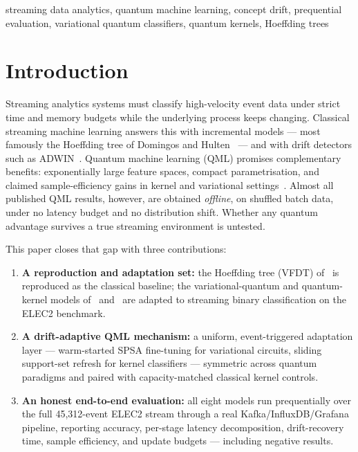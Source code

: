 \documentclass[conference]{IEEEtran}
\begin{document}
\begin{IEEEkeywords}
streaming data analytics, quantum machine learning, concept drift, prequential evaluation,
variational quantum classifiers, quantum kernels, Hoeffding trees
\end{IEEEkeywords}

\section{Introduction}
\label{sec:intro}

Streaming analytics systems must classify high-velocity event data under strict time and
memory budgets while the underlying process keeps changing. Classical streaming machine
learning answers this with incremental models --- most famously the Hoeffding tree of
Domingos and Hulten~\cite{domingos2000} --- and with drift detectors such as
ADWIN~\cite{bifet2007adwin}. Quantum machine learning (QML) promises complementary
benefits: exponentially large feature spaces, compact parametrisation, and claimed sample-efficiency gains in kernel and variational
settings~\cite{schuld2019,herbst2024,tscharke2023}. Almost all published QML results,
however, are obtained \emph{offline}, on shuffled batch data, under no latency budget and
no distribution shift. Whether any quantum advantage survives a true streaming
environment is untested.

This paper closes that gap with three contributions:
\begin{enumerate}
  \item \textbf{A reproduction and adaptation set:} the Hoeffding tree (VFDT) of~\cite{domingos2000}
    is reproduced as the classical baseline; the variational-quantum and quantum-kernel
    models of~\cite{herbst2024} and~\cite{tscharke2023} are adapted to streaming binary
    classification on the ELEC2 benchmark.
  \item \textbf{A drift-adaptive QML mechanism:} a uniform, event-triggered adaptation
    layer --- warm-started SPSA fine-tuning for variational circuits, sliding support-set
    refresh for kernel classifiers --- symmetric across quantum paradigms and paired with
    capacity-matched classical kernel controls.
  \item \textbf{An honest end-to-end evaluation:} all eight models run prequentially over
    the full 45{,}312-event ELEC2 stream through a real Kafka/InfluxDB/Grafana pipeline,
    reporting accuracy, per-stage latency decomposition, drift-recovery time, sample
    efficiency, and update budgets --- including negative results.
\end{enumerate}
\end{document}
